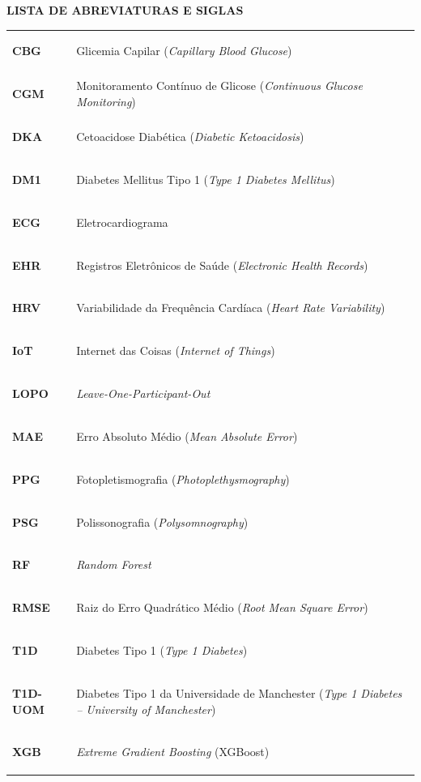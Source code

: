 \documentclass[12pt,a4paper]{article}
\begin{document}
\clearpage

\tableofcontents

\clearpage
\begin{samepage}
    \begin{center}
        \textbf{\large LISTA DE ABREVIATURAS E SIGLAS}
    \end{center}
    \vspace{1cm}

\begin{tabular}{l l}
    \hypertarget{sigla:CBG}{\textbf{CBG}}  & Glicemia Capilar (\textit{Capillary Blood Glucose}) \\
    \hypertarget{sigla:CGM}{\textbf{CGM}}  & Monitoramento Contínuo de Glicose (\textit{Continuous Glucose Monitoring}) \\
    \hypertarget{sigla:DKA}{\textbf{DKA}}  & Cetoacidose Diabética (\textit{Diabetic Ketoacidosis}) \\
    \hypertarget{sigla:DM1}{\textbf{DM1}}  & Diabetes Mellitus Tipo 1 (\textit{Type 1 Diabetes Mellitus}) \\
    \hypertarget{sigla:ECG}{\textbf{ECG}}  & Eletrocardiograma \\
    \hypertarget{sigla:EHR}{\textbf{EHR}}  & Registros Eletrônicos de Saúde (\textit{Electronic Health Records}) \\
    \hypertarget{sigla:HRV}{\textbf{HRV}}  & Variabilidade da Frequência Cardíaca (\textit{Heart Rate Variability}) \\
    \hypertarget{sigla:IoT}{\textbf{IoT}}  & Internet das Coisas (\textit{Internet of Things}) \\
    \hypertarget{sigla:LOPO}{\textbf{LOPO}}  & \textit{Leave-One-Participant-Out} \\
    \hypertarget{sigla:MAE}{\textbf{MAE}}  & Erro Absoluto Médio (\textit{Mean Absolute Error}) \\
    \hypertarget{sigla:PPG}{\textbf{PPG}}  & Fotopletismografia (\textit{Photoplethysmography}) \\
    \hypertarget{sigla:PSG}{\textbf{PSG}}  & Polissonografia (\textit{Polysomnography}) \\
    \hypertarget{sigla:RF}{\textbf{RF}}  & \textit{Random Forest} \\
    \hypertarget{sigla:RMSE}{\textbf{RMSE}} & Raiz do Erro Quadrático Médio (\textit{Root Mean Square Error}) \\
    \hypertarget{sigla:T1D}{\textbf{T1D}}  & Diabetes Tipo 1 (\textit{Type 1 Diabetes}) \\
    \hypertarget{sigla:T1D-UOM}{\textbf{T1D-UOM}}  & Diabetes Tipo 1 da Universidade de Manchester (\textit{Type 1 Diabetes -- University of Manchester}) \\
    \hypertarget{sigla:XGB}{\textbf{XGB}}  & \textit{Extreme Gradient Boosting} (XGBoost) \\
\end{tabular}
\end{samepage}
\clearpage
\end{document}
